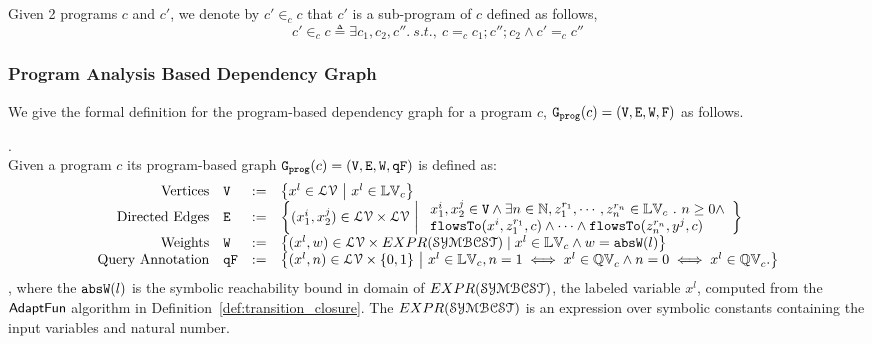 %
Given 2 programs $c$ and $c'$, we denote by $c' \in_{c} c$  that $c'$ is a sub-program of $c$ defined as follows,
\begin{equation}
c' \in_{c} c \triangleq \exists c_1, c_2, c''. ~ s.t.,~
c =_{c} c_1; c''; c_2 \land c' =_{c} c''
\end{equation} 
%

\subsubsection{Program Analysis Based Dependency Graph}
We give the formal definition for the program-based dependency graph for a program $c$, 
$\mathtt{{G_{prog}}}({c}) = (\mathtt{V}, \mathtt{E}, \mathtt{W}, \mathtt{F})$ as follows.
\begin{defn}
    .
    \label{def:prog_graph}
    \\
Given a program ${c}$
its program-based graph 
$\mathtt{{G_{prog}}}({c}) = (\mathtt{V}, \mathtt{E}, \mathtt{W}, \mathtt{qF})$ is defined as:
{\footnotesize
\[
\begin{array}{rlcl}
\text{Vertices} &
\vertxs & := & \left\{ 
x^l \in \mathcal{LV} 
~ \middle\vert ~
x^l \in \lvar_{c}
\right\}
\\
\text{Directed Edges} &
\edges & := & 
\left\{ 
  ({x}_1^{i}, {x}_2^{j}) \in \mathcal{LV} \times \mathcal{LV}
  ~ \middle\vert ~
  \begin{array}{l}
    {x}_1^{i}, {x}_2^{j} \in \vertxs
	\land
    \exists n \in \mathbb{N}, z_1^{r_1}, \cdots, z_n^{r_n} \in \lvar_{{c}} \st 
    n \geq 0 \land
    \\
    \flowsto(x^i,  z_1^{r_1}, c) 
    \land \cdots \land \flowsto(z_n^{r_n}, y^j, c) 
  \end{array}
\right\}
\\
\text{Weights} &
\weights & := &
	\left\{ (x^l, w) \in  \mathcal{LV} \times EXPR(\constdom)
	\mid
	x^l \in \lvar_{{c}} \land w = \absW(l)
	\right\}
\\
\text{Query Annotation} &
\qflag & := & 
\left\{(x^l, n)  \in  \mathcal{LV} \times \{0, 1\} 
~ \middle\vert ~
 x^l \in \lvar_{c},
n = 1 \iff x^l \in \qvar_{c} \land n = 0 \iff  x^l \in \qvar_{c} .
\right\}
\end{array}
\] 
}
, where the $\mathtt{abs}{\mathtt{W}}(l)$ is the symbolic reachability bound in domain of $EXPR(\mathcal{SYMBCST})$,
the labeled variable $x^l$, 
computed from the $\textsf{AdaptFun}$ algorithm 
in Definition~\ref{def:transition_closure}.
The $EXPR(\mathcal{SYMBCST})$ is an expression over symbolic constants containing the
input variables and natural number.
\end{defn} 
%
